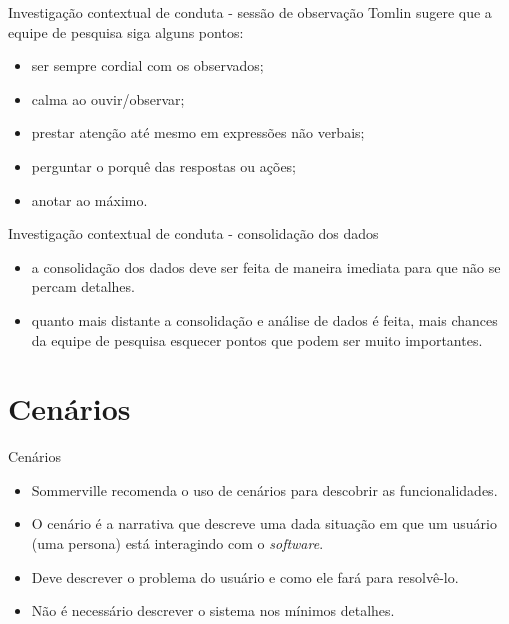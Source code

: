 \documentclass[11pt]{beamer}
\begin{document}
   \begin{frame}{Investigação contextual de conduta - sessão de observação}
      Tomlin sugere que a equipe de pesquisa siga alguns pontos:
      \begin{itemize}
         \item ser sempre cordial com os observados;
         \item calma ao ouvir/observar;
         \item prestar atenção até mesmo em expressões não verbais;
         \item perguntar o porquê das respostas ou ações;
         \item anotar ao máximo.
      \end{itemize}
   \end{frame}

   \begin{frame}{Investigação contextual de conduta - consolidação dos dados}
      \begin{itemize}
         \item a consolidação dos dados deve ser feita de maneira imediata para que não se percam detalhes.
         \item quanto mais distante a consolidação e análise de dados é feita, mais chances da equipe de pesquisa esquecer pontos que podem ser muito importantes.
      \end{itemize}
   \end{frame}

   \section{Cenários}

   \begin{frame}{Cenários}
      \begin{itemize}
         \item Sommerville recomenda o uso de cenários para descobrir as funcionalidades.
         \item O cenário é a narrativa que descreve uma dada situação em que um usuário (uma persona) está interagindo com o \textit{software}.
         \item Deve descrever o problema do usuário e como ele fará para resolvê-lo.
         \item Não é necessário descrever o sistema nos mínimos detalhes.
      \end{itemize}
   \end{frame}
\end{document}
